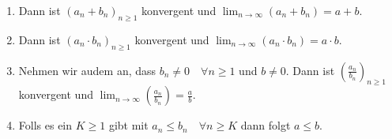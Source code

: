 \documentclass[10pt,landscape]{article}
\begin{document}
\begin{multicols}{3}
\begin{enumerate}
        \item Dann ist $\left(a_{n}+b_{n}\right)_{n \geq 1}$ konvergent und $\lim _{n \rightarrow \infty}\left(a_{n}+b_{n}\right)=a+b$.
        \item Dann ist $\left(a_{n} \cdot b_{n}\right)_{n \geq 1}$ konvergent und $\lim _{n \rightarrow \infty}\left(a_{n} \cdot b_{n}\right)=a \cdot b .$
        \item Nehmen wir audem an, dass $b_{n} \neq 0 \quad \forall n \geq 1$ und $b \neq 0$. Dann ist $\left(\frac{a_{n}}{b_{n}}\right)_{n \geq 1}$
        konvergent und $\lim _{n \rightarrow \infty}\left(\frac{a_{n}}{b_{n}}\right)=\frac{a}{b} .$
        \item Folls es ein $K \geq 1$ gibt mit $a_{n} \leq b_{n} \quad \forall n \geq K$ dann folgt $a \leq b .$
\end{enumerate}

\end{multicols}
\end{document}
